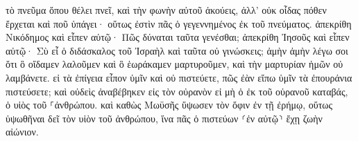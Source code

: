 \documentclass{openreader}
\begin{document}
τὸ πνεῦμα ὅπου θέλει πνεῖ, καὶ τὴν φωνὴν αὐτοῦ ἀκούεις, ἀλλ’ οὐκ οἶδας πόθεν ἔρχεται καὶ ποῦ ὑπάγει· οὕτως ἐστὶν πᾶς ὁ γεγεννημένος ἐκ τοῦ πνεύματος. 
ἀπεκρίθη Νικόδημος καὶ εἶπεν αὐτῷ· Πῶς δύναται ταῦτα γενέσθαι; 
ἀπεκρίθη Ἰησοῦς καὶ εἶπεν αὐτῷ· Σὺ εἶ ὁ διδάσκαλος τοῦ Ἰσραὴλ καὶ ταῦτα οὐ γινώσκεις; 
ἀμὴν ἀμὴν λέγω σοι ὅτι ὃ οἴδαμεν λαλοῦμεν καὶ ὃ ἑωράκαμεν μαρτυροῦμεν, καὶ τὴν μαρτυρίαν ἡμῶν οὐ λαμβάνετε. 
εἰ τὰ ἐπίγεια εἶπον ὑμῖν καὶ οὐ πιστεύετε, πῶς ἐὰν εἴπω ὑμῖν τὰ ἐπουράνια πιστεύσετε; 
καὶ οὐδεὶς ἀναβέβηκεν εἰς τὸν οὐρανὸν εἰ μὴ ὁ ἐκ τοῦ οὐρανοῦ καταβάς, ὁ υἱὸς τοῦ ⸀ἀνθρώπου. 
καὶ καθὼς Μωϋσῆς ὕψωσεν τὸν ὄφιν ἐν τῇ ἐρήμῳ, οὕτως ὑψωθῆναι δεῖ τὸν υἱὸν τοῦ ἀνθρώπου, 
ἵνα πᾶς ὁ πιστεύων ⸂ἐν αὐτῷ⸃ ἔχῃ ζωὴν αἰώνιον. 
\end{document}

